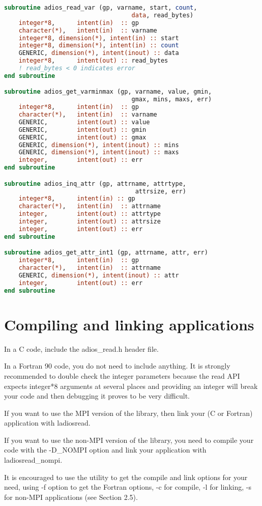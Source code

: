 \documentclass{report}
\begin{document}
\begin{lstlisting}[language=Fortran]
subroutine adios_read_var (gp, varname, start, count,
                                   data, read_bytes)
    integer*8,      intent(in)  :: gp
    character(*),   intent(in)  :: varname
    integer*8, dimension(*), intent(in) :: start
    integer*8, dimension(*), intent(in) :: count
    GENERIC, dimension(*), intent(inout) :: data
    integer*8,      intent(out) :: read_bytes
    ! read_bytes < 0 indicates error
end subroutine

subroutine adios_get_varminmax (gp, varname, value, gmin, 
                                   gmax, mins, maxs, err)
    integer*8,      intent(in)  :: gp
    character(*),   intent(in)  :: varname
    GENERIC,        intent(out) :: value
    GENERIC,        intent(out) :: gmin
    GENERIC,        intent(out) :: gmax
    GENERIC, dimension(*), intent(inout) :: mins
    GENERIC, dimension(*), intent(inout) :: maxs
    integer,        intent(out) :: err
end subroutine

subroutine adios_inq_attr (gp, attrname, attrtype, 
                                    attrsize, err)
    integer*8,      intent(in) :: gp
    character(*),   intent(in)  :: attrname
    integer,        intent(out) :: attrtype
    integer,        intent(out) :: attrsize
    integer,        intent(out) :: err
end subroutine

subroutine adios_get_attr_int1 (gp, attrname, attr, err)
    integer*8,      intent(in)  :: gp
    character(*),   intent(in)  :: attrname
    GENERIC, dimension(*), intent(inout) :: attr
    integer,        intent(out) :: err 
end subroutine
\end{lstlisting}\label{HToc182553414}

\section{Compiling and linking applications}

In a C code, include the adios\_read.h header file. 

In a Fortran 90 code, you do not need to include anything. It is strongly recommended 
to double check the integer parameters because the read API expects integer*8 arguments 
at several places and providing an integer will break your code and then debugging 
it proves to be very difficult.

If you want to use the MPI version of the library, then link your (C or Fortran) 
application with \-{}ladiosread.

If you want to use the non-MPI version of the library, you need to compile your 
code with the -D\_NOMPI option and link your application with \-{}ladiosread\_nompi.

It is encouraged to use the utility to get the compile and link options for your 
need, using -f option to get the Fortran options, -c for compile, -l for linking, 
-s for non-MPI applications (see Section 2.5). \label{HToc182553415}
\end{document}
